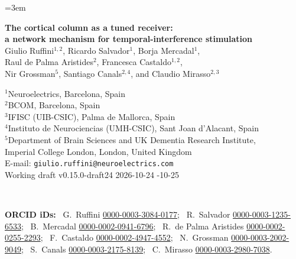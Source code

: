 \documentclass[11pt,a4paper]{article}
\newif\ifjne
\newcommand{\paperver}{0.15.0-draft24} %
\providecommand{\DIFaddtex}[1]{{\protect\color{blue} \sf #1}} %
\providecommand{\DIFdeltex}[1]{{\protect\color{red} \scriptsize #1}} %
\providecommand{\DIFaddbegin}{} %
\providecommand{\DIFaddend}{} %
\providecommand{\DIFdelbegin}{} %
\providecommand{\DIFdelend}{} %
\providecommand{\DIFadd}[1]{\texorpdfstring{\DIFaddtex{#1}}{#1}} %
\providecommand{\DIFdel}[1]{\texorpdfstring{\DIFdeltex{#1}}{}} %
\begin{document}
\emergencystretch=3em
\par

\ifjne
\begin{center}
{\LARGE\bfseries The cortical column as a tuned receiver:\\[4pt]
a network mechanism for temporal-interference stimulation}\\[16pt]
{\large Giulio Ruffini$^{1,2}$, Ricardo Salvador$^{1}$, Borja Mercadal$^{1}$,\\[2pt]
Raul de Palma Aristides$^{2}$, Francesca Castaldo$^{1,2}$,\\[2pt]
Nir Grossman$^{5}$, Santiago Canals$^{2,4}$, and Claudio Mirasso$^{2,3}$}\\[12pt]
\begin{minipage}{0.86\textwidth}\centering\small
$^{1}$Neuroelectrics, Barcelona, Spain\\
$^{2}$BCOM, Barcelona, Spain\\
$^{3}$IFISC (UIB-CSIC), Palma de Mallorca, Spain\\
$^{4}$Instituto de Neurociencias (UMH-CSIC), Sant Joan d'Alacant, Spain\\
$^{5}$Department of Brain Sciences and UK Dementia Research Institute,\\
Imperial College London, London, United Kingdom\\[6pt]
E-mail: \texttt{giulio.ruffini@neuroelectrics.com}\\[4pt]
Working draft v\paperver\quad \DIFdelbegin \DIFdel{2026-10-24
}\DIFdelend \DIFaddbegin \DIFadd{2026-10-25
}\DIFaddend \end{minipage}\\[8pt]
\begin{minipage}{0.86\textwidth}\centering\footnotesize\color{negray}
\textbf{ORCID iDs:}\ %
G.~Ruffini \href{https://orcid.org/0000-0003-3084-0177}{0000-0003-3084-0177};\ %
R.~Salvador \href{https://orcid.org/0000-0003-1235-6533}{0000-0003-1235-6533};\ %
B.~Mercadal \href{https://orcid.org/0000-0002-0941-6796}{0000-0002-0941-6796};\ %
R.~de Palma Aristides \href{https://orcid.org/0000-0002-0255-2293}{0000-0002-0255-2293};\ %
F.~Castaldo \href{https://orcid.org/0000-0002-4947-4552}{0000-0002-4947-4552};\ %
N.~Grossman \href{https://orcid.org/0000-0003-2002-9049}{0000-0003-2002-9049};\ %
S.~Canals \href{https://orcid.org/0000-0003-2175-8139}{0000-0003-2175-8139};\ %
C.~Mirasso \href{https://orcid.org/0000-0003-2980-7038}{0000-0003-2980-7038}.
\end{minipage}
\end{center}
\end{document}
